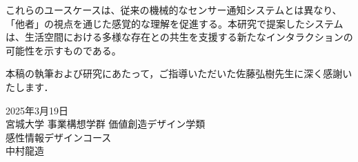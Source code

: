\documentclass{cuxarticle}
\begin{document}
これらのユースケースは、従来の機械的なセンサー通知システムとは異なり、「他者」の視点を通じた感覚的な理解を促進する。本研究で提案したシステムは、生活空間における多様な存在との共生を支援する新たなインタラクションの可能性を示すものである。

本稿の執筆および研究にあたって，ご指導いただいた佐藤弘樹先生に深く感謝いたします．

\vspace{3\zh}
\begin{flushright}
  2025年3月19日 \\
  宮城大学 事業構想学群 価値創造デザイン学類 \\
  感性情報デザインコース \\
  中村龍造
\end{flushright}

\newpage
\renewcommand{\refname}{\huge 参考文献}


\end{document}
